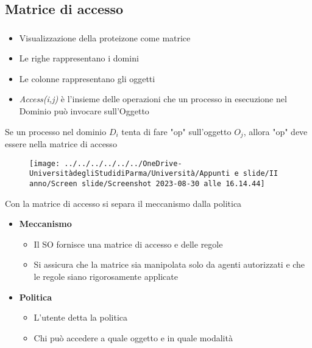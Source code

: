 \documentclass{beamer}
\newenvironment{mainframe}{
	\begin{frame}
		\frametitle{\insertsubsection}
		\framesubtitle{\insertsection}
	}{
	\end{frame}
}
\begin{document}
\subsection{Matrice di accesso}
\begin{mainframe}
	\begin{itemize}
		\item Visualizzazione della proteizone come matrice
		\item Le righe rappresentano i domini
		\item Le colonne rappresentano gli oggetti
		\item \textit{Access(i,j)} è l'insieme delle operazioni che un processo in esecuzione nel Dominio può invocare sull'Oggetto
	\end{itemize}
	Se un processo nel dominio $D_i$ tenta di fare "op" sull'oggetto $O_j$, allora "op" deve essere nella matrice di accesso
	\begin{figure}
		\centering
		\texttt{[image: ../../../../../../OneDrive-UniversitàdegliStudidiParma/Università/Appunti e slide/II anno/Screen slide/Screenshot 2023-08-30 alle 16.14.44]}
	\end{figure}
\end{mainframe}
\begin{frame}
	Con la matrice di accesso si separa il meccanismo dalla politica
	\begin{itemize}
		\item \textbf{Meccanismo}
		\begin{itemize}
			\item Il SO fornisce una matrice di accesso e delle regole
			\item Si assicura che la matrice sia manipolata solo da agenti autorizzati e che le regole siano rigorosamente applicate
		\end{itemize}
		\item \textbf{Politica}
		\begin{itemize}
			\item L'utente detta la politica
			\item Chi può accedere a quale oggetto e in quale modalità
		\end{itemize}
	\end{itemize}
\end{frame}
\end{document}
